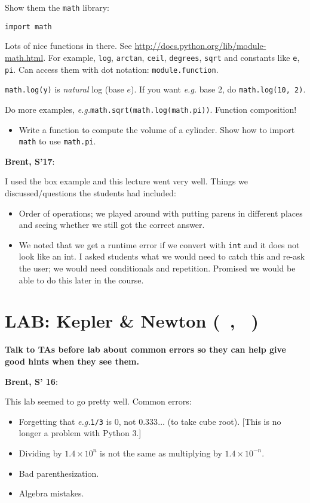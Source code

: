 \documentclass{article}
\newcommand{\eg}{\emph{e.g.}\xspace}
\newenvironment{reflect}[1]
{
  \noindent
  \begin{lrbox}{\reflectbox}
    \begin{minipage}[t]{\textwidth}
      \textbf{#1}:
}{
    \end{minipage}
  \end{lrbox}
  \fbox{\usebox{\reflectbox}}
}
\newcommand{\shortmonthname}{\StrLeft{\datemonthname}{3}}
\newcommand{\showdate}{\thedateday\ \shortmonthname}
\newcommand{\lab}[1]{\section*{LAB: #1 (\showdate\nextdate, \showdate)}}
\begin{document}
Show them the \verb|math| library:

\begin{verbatim}
import math
\end{verbatim}

Lots of nice functions in there.  See
\url{http://docs.python.org/lib/module-math.html}.  For example,
\verb|log|, \verb|arctan|, \verb|ceil|, \verb|degrees|, \verb|sqrt|
and constants like \verb|e|, \verb|pi|.  Can access them with dot
notation: \verb|module.function|.

\verb|math.log(y)| is \emph{natural} log (base $e$). If you want
\eg base 2, do \verb|math.log(10, 2)|.

Do more examples, \eg \verb|math.sqrt(math.log(math.pi))|.  Function
composition!

\begin{itemize}
\item Write a function to compute the volume of a cylinder.  Show how
  to import \texttt{math} to use \texttt{math.pi}.
\end{itemize}

\begin{reflect}{Brent, S'17}
  I used the box example and this lecture went very well.  Things we
  discussed/questions the students had included:

  \begin{itemize}
  \item Order of operations; we played around with putting parens in
    different places and seeing whether we still got the correct
    answer.
  \item We noted that we get a runtime error if we convert with
    \verb|int| and it does not look like an int.  I asked students
    what we would need to catch this and re-ask the user; we would
    need conditionals and repetition.  Promised we would be able to do
    this later in the course.
  \end{itemize}
\end{reflect}

\newpage

\lab{Kepler \& Newton}

\textbf{Talk to TAs before lab about common errors so they can help
  give good hints when they see them.}

\begin{reflect}{Brent, S' 16}
This lab seemed to go pretty well.  Common errors:
\begin{itemize}
\item Forgetting that \eg \verb|1/3| is 0, not $0.333\dots$ (to take
  cube root).  [This is no longer a problem with Python 3.]
\item Dividing by $1.4\times 10^n$ is not the same as multiplying by
  $1.4 \times 10^{-n}$.
\item Bad parenthesization.
\item Algebra mistakes.
\end{itemize}

\end{reflect}
\end{document}
